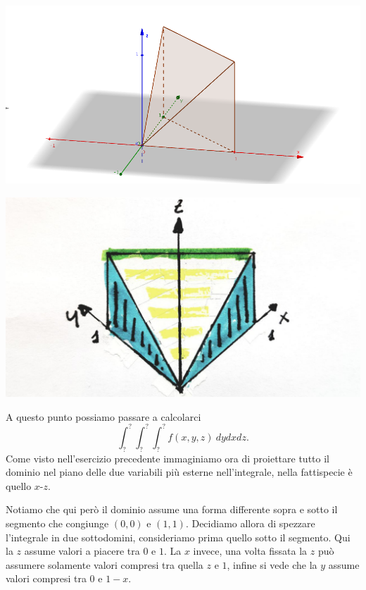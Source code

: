 \documentclass[10pt]{article}
\theoremstyle{plain}
\theoremstyle{definition}
\begin{document}
\begin{minipage}{.5\textwidth}
\centering
\includegraphics[width=1.5\textwidth]{fig8.png}
\end{minipage}%
\begin{minipage}{.50\textwidth}
\centering
\includegraphics[width=1.4\textwidth]{fig9.jpg}
\end{minipage}
\newline
A questo punto possiamo passare a calcolarci 
$$ \int_?^?\int_?^?\int_?^?f(x,y,z)\ dy dx dz. $$
Come visto nell'esercizio precedente immaginiamo ora di proiettare tutto il dominio nel piano delle due variabili più esterne nell'integrale, nella fattispecie è quello $x$-$z$.
\newline
\begin{minipage}{.5\textwidth}
Notiamo che qui però il dominio assume una forma differente sopra e sotto il segmento che congiunge $(0,0)$ e $(1,1)$. Decidiamo allora di spezzare l'integrale in due sottodomini, consideriamo prima quello sotto il segmento. Qui la $z$ assume valori a piacere tra $0$ e $1$. La $x$ invece, una volta fissata la $z$ può assumere solamente valori compresi tra quella $z$ e $1$, infine si vede che la $y$ assume valori compresi tra $0$ e $1-x$.
\end{minipage}%
\end{document}
